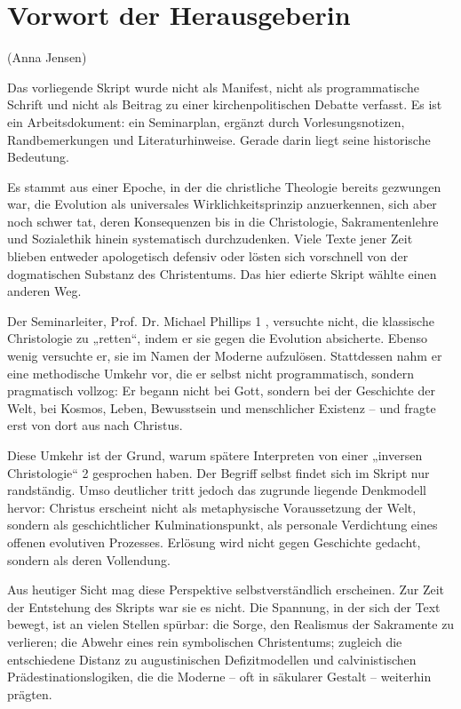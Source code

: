 \documentclass[
]{article}
\begin{document}
\section{Vorwort der Herausgeberin}\label{vorwort-der-herausgeberin}

(Anna Jensen)

Das vorliegende Skript wurde nicht als Manifest, nicht als programmatische Schrift und nicht als Beitrag zu einer kirchenpolitischen Debatte verfasst. Es ist ein Arbeitsdokument: ein Seminarplan, ergänzt durch Vorlesungsnotizen, Randbemerkungen und Literaturhinweise. Gerade darin liegt seine historische Bedeutung.

Es stammt aus einer Epoche, in der die christliche Theologie bereits gezwungen war, die Evolution als universales Wirklichkeitsprinzip anzuerkennen, sich aber noch schwer tat, deren Konsequenzen bis in die Christologie, Sakramentenlehre und Sozialethik hinein systematisch durchzudenken. Viele Texte jener Zeit blieben entweder apologetisch defensiv oder lösten sich vorschnell von der dogmatischen Substanz des Christentums. Das hier edierte Skript wählte einen anderen Weg.

Der Seminarleiter, Prof. Dr. Michael Phillips 1 , versuchte nicht, die klassische Christologie zu „retten“, indem er sie gegen die Evolution absicherte. Ebenso wenig versuchte er, sie im Namen der Moderne aufzulösen. Stattdessen nahm er eine methodische Umkehr vor, die er selbst nicht programmatisch, sondern pragmatisch vollzog: Er begann nicht bei Gott, sondern bei der Geschichte der Welt, bei Kosmos, Leben, Bewusstsein und menschlicher Existenz – und fragte erst von dort aus nach Christus.

Diese Umkehr ist der Grund, warum spätere Interpreten von einer „inversen Christologie“ 2 gesprochen haben. Der Begriff selbst findet sich im Skript nur randständig. Umso deutlicher tritt jedoch das zugrunde liegende Denkmodell hervor: Christus erscheint nicht als metaphysische Voraussetzung der Welt, sondern als geschichtlicher Kulminationspunkt, als personale Verdichtung eines offenen evolutiven Prozesses. Erlösung wird nicht gegen Geschichte gedacht, sondern als deren Vollendung.

Aus heutiger Sicht mag diese Perspektive selbstverständlich erscheinen. Zur Zeit der Entstehung des Skripts war sie es nicht. Die Spannung, in der sich der Text bewegt, ist an vielen Stellen spürbar: die Sorge, den Realismus der Sakramente zu verlieren; die Abwehr eines rein symbolischen Christentums; zugleich die entschiedene Distanz zu augustinischen Defizitmodellen und calvinistischen Prädestinationslogiken, die die Moderne – oft in säkularer Gestalt – weiterhin prägten.
\end{document}
